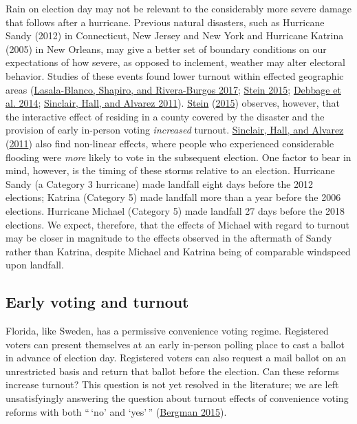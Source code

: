 \documentclass[
  12pt,
]{article}
\begin{document}
Rain on election day may not be relevant to the considerably more severe damage that follows after a hurricane. Previous natural disasters, such as Hurricane Sandy (2012) in Connecticut, New Jersey and New York and Hurricane Katrina (2005) in New Orleans, may give a better set of boundary conditions on our expectations of how severe, as opposed to inclement, weather may alter electoral behavior. Studies of these events found lower turnout within effected geographic areas (\protect\hyperlink{ref-Lasala-Blanco2017}{Lasala-Blanco, Shapiro, and Rivera-Burgos 2017}; \protect\hyperlink{ref-Stein2015}{Stein 2015}; \protect\hyperlink{ref-Debbage2014}{Debbage et al. 2014}; \protect\hyperlink{ref-Sinclair2011}{Sinclair, Hall, and Alvarez 2011}). \protect\hyperlink{ref-Stein2015}{Stein} (\protect\hyperlink{ref-Stein2015}{2015}) observes, however, that the interactive effect of residing in a county covered by the disaster and the provision of early in-person voting \emph{increased} turnout. \protect\hyperlink{ref-Sinclair2011}{Sinclair, Hall, and Alvarez} (\protect\hyperlink{ref-Sinclair2011}{2011}) also find non-linear effects, where people who experienced considerable flooding were \emph{more} likely to vote in the subsequent election. One factor to bear in mind, however, is the timing of these storms relative to an election. Hurricane Sandy (a Category 3 hurricane) made landfall eight days before the 2012 elections; Katrina (Category 5) made landfall more than a year before the 2006 elections. Hurricane Michael (Category 5) made landfall 27 days before the 2018 elections. We expect, therefore, that the effects of Michael with regard to turnout may be closer in magnitude to the effects observed in the aftermath of Sandy rather than Katrina, despite Michael and Katrina being of comparable windspeed upon landfall.

\hypertarget{early-voting-and-turnout}{%
\subsection*{Early voting and turnout}\label{early-voting-and-turnout}}

Florida, like Sweden, has a permissive convenience voting regime. Registered voters can present themselves at an early in-person polling place to cast a ballot in advance of election day. Registered voters can also request a mail ballot on an unrestricted basis and return that ballot before the election. Can these reforms increase turnout? This question is not yet resolved in the literature; we are left unsatisfyingly answering the question about turnout effects of convenience voting reforms with both ``\,`no' and `yes'\,'' (\protect\hyperlink{ref-Bergman2015}{Bergman 2015}).
\end{document}
